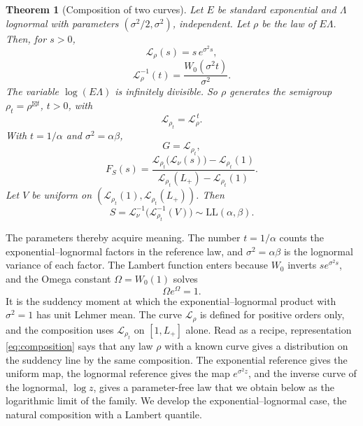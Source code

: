 \documentclass[sn-mathphys-num]{sn-jnl}\newcommand{\SNJNL}{}
\theoremstyle{thmstyleone}
\newtheorem{theorem}{Theorem}
\theoremstyle{thmstyletwo}
\theoremstyle{thmstylethree}
\theoremstyle{thmstyleone}
\providecommand{\Leh}{\mathscr{L}}
\providecommand{\LL}{\mathrm{LL}}
\begin{document}
	\begin{theorem}[Composition of two curves]
		\label{thm:origin}
		Let $E$ be standard exponential and $\Lambda$ lognormal with
		parameters $(\sigma^{2}/2,\sigma^{2})$, independent. Let $\rho$ be
		the law of $E\Lambda$. Then, for $s>0$,
		\begin{equation}\label{eq:rhocurve}
			\Leh_\rho(s)=s\,e^{\sigma^{2}s},
		\end{equation}
		\begin{equation}\label{eq:rhoinverse}
			\Leh_\rho^{-1}(t)=\frac{W_0(\sigma^{2}t)}{\sigma^{2}} .
		\end{equation}
		The variable $\log(E\Lambda)$ is infinitely divisible. So $\rho$
		generates the semigroup $\rho_t=\rho^{\boxtimes t}$, $t>0$, with
		\begin{equation}\label{eq:rhotcurve}
			\Leh_{\rho_t}=\Leh_\rho^{\,t}.
		\end{equation}
		With $t=1/\alpha$ and $\sigma^{2}=\alpha\beta$,
		\begin{equation}\label{eq:GisLehmer}
			G=\Leh_{\rho_t},
		\end{equation}
		\begin{equation}\label{eq:composition}
			F_S(s)=\frac{\Leh_{\rho_t}\bigl(\Leh_\nu(s)\bigr)-\Leh_{\rho_t}(1)}
			{\Leh_{\rho_t}(L_+)-\Leh_{\rho_t}(1)} .
		\end{equation}
		Let $V$ be uniform on $(\Leh_{\rho_t}(1),\Leh_{\rho_t}(L_+))$. Then
		\begin{equation}\label{eq:Srep}
			S=\Leh_\nu^{-1}\bigl(\Leh_{\rho_t}^{-1}(V)\bigr)
			\sim\LL(\alpha,\beta).
		\end{equation}
	\end{theorem}
	
	The parameters thereby acquire meaning. The number $t=1/\alpha$
	counts the exponential--lognormal factors in the reference law, and
	$\sigma^{2}=\alpha\beta$ is the lognormal variance of each factor.
	The Lambert function enters because $W_0$ inverts $se^{\sigma^{2}s}$,
	and the Omega constant $\Omega=W_0(1)$ solves
	\begin{equation}\label{eq:omegadef}
		\Omega e^{\Omega}=1 .
	\end{equation}
	It is the suddency moment at which the exponential--lognormal
	product with $\sigma^{2}=1$ has unit Lehmer mean. The curve
	$\Leh_\rho$ is defined for positive orders only, and the composition
	uses $\Leh_{\rho_t}$ on $[1,L_+]$ alone. Read as a recipe, representation \eqref{eq:composition}
	says that any law $\rho$ with a known curve gives a distribution on
	the suddency line by the same composition. The exponential reference
	gives the uniform map, the lognormal reference gives the map
	$e^{\sigma^{2}z}$, and the inverse curve of the lognormal, $\log z$,
	gives a parameter-free law that we obtain below as the logarithmic
	limit of the family. We develop the exponential--lognormal case, the natural composition
	with a Lambert quantile.
	
\end{document}
